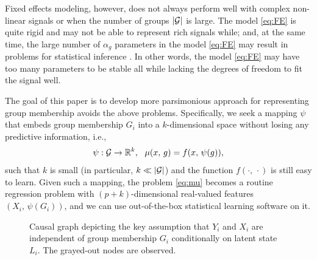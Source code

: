 \documentclass{article}
\theoremstyle{plain}
\theoremstyle{definition}
\theoremstyle{remark}
\begin{document}
Fixed effects modeling, however, does not always perform well with complex non-linear signals
or when the number of groups $\left\lvert\mathcal{G}\right\rvert$ is large. The model \eqref{eq:FE} is quite rigid
and may not be able to represent rich signals while; and, at the same time, the large number of $\alpha_g$
parameters in the model \eqref{eq:FE} may result in problems for statistical inference \citep{neyman1948consistent}.
In other words, the model \eqref{eq:FE} may have too many parameters to be stable all while lacking the
degrees of freedom to fit the signal well.

The goal of this paper is to develop more parsimonious approach for representing group membership
avoids the above problems. Specifically, we seek a mapping $\psi$ that embeds group membership $G_i$
into a $k$-dimensional space without losing any predictive information, i.e.,
\begin{equation}
\label{eq:repr}
\psi: \mathcal{G} \rightarrow \mathbb{R}^k, \ \ \mu(x, \, g) = f(x, \, \psi(g)),
\end{equation}
such that $k$ is small (in particular, $k \ll \left\lvert\mathcal{G}\right\rvert$) and the function $f(\cdot, \, \cdot)$ is still easy to learn.
Given such a mapping, the problem \eqref{eq:mu} becomes a routine regression problem with
$(p+k)$-dimensional real-valued features $(X_i, \, \psi(G_i))$, and we can use out-of-the-box statistical learning
software on it.

\begin{figure}[t]
\centering
{}
\caption{Causal graph depicting the key assumption that $Y_i$ and $X_i$ are independent of group
membership $G_i$ conditionally on latent state $L_i$. The grayed-out nodes are observed.}
\label{fig:graph_simple}
\end{figure}
\end{document}
